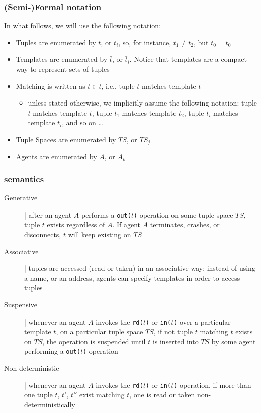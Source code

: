 \documentclass[presentation]{beamer}\mode<presentation>{\usetheme{AMSCesenaPurpleAndGold}}
\begin{document}
\begin{frame}%
\frametitle{(Semi-)Formal notation}

In what follows, we will use the following notation:
%
\vfill
%
\begin{itemize}
\item Tuples are enumerated by \alert{$t$}, or $t_i$, so, for instance, $t_1 \neq t_2$, but $t_0 = t_0$

\item Templates are enumerated by \alert{$\bar{t}$}, or $\bar{t}_i$. Notice that templates are a compact way to represent \alert{sets} of tuples

\item Matching is written as \alert{$t \in \bar{t}$}, i.e., tuple $t$ matches template $\bar{t}$
%
\begin{itemize}
\item unless stated otherwise, we implicitly assume the following notation: tuple $t$ matches template $\bar{t}$, tuple $t_1$ matches template $\bar{t_2}$, tuple $t_i$ matches template $\bar{t_i}$, and so on \ldots
\end{itemize}

\item Tuple Spaces are enumerated by \alert{$TS$}, or $TS_j$

\item Agents are enumerated by \alert{$A$}, or $A_k$
\end{itemize}

\end{frame}

\begin{frame}[fragile]
\frametitle{ semantics}
\label{linda-semantics}

\begin{description}
\item[Generative] | after an agent $A$ performs a \texttt{out($t$)} operation on some tuple space $TS$, tuple $t$ \alert{exists} regardless of $A$. 
%
If agent $A$ terminates, crashes, or disconnects, $t$ will keep existing on $TS$

\item[Associative] | tuples are \alert{accessed} (read or taken) in an associative way: instead of using a name, or an address, agents can specify \alert{templates} in order to access tuples

\item[Suspensive] | whenever an agent $A$ invokes the \texttt{rd($\bar{t}$)} or \texttt{in($\bar{t}$)} over a particular template $\bar{t}$, on a particular tuple space $TS$, if not tuple $t$ matching $\bar{t}$ exists on $TS$, the operation is \alert{suspended} until $t$ is inserted into $TS$ by some agent performing a \texttt{out($t$)} operation

\item[Non-deterministic] | whenever an agent $A$ invokes the \texttt{rd($\bar{t}$)} or \texttt{in($\bar{t}$)} operation, if more than one tuple $t$, $t'$, $t''$ exist matching  $\bar{t}$, one is read or taken  \alert{non-deterministically}

\end{description}

\end{frame}
\end{document}
